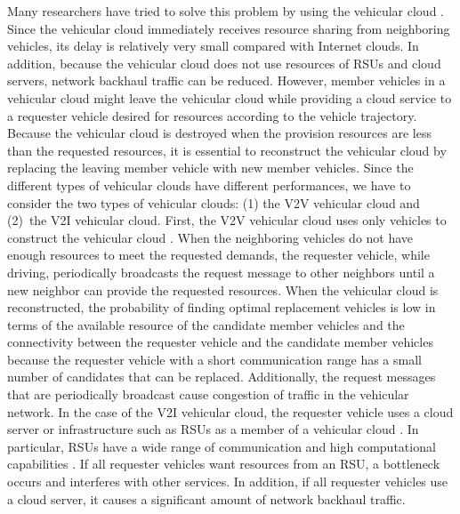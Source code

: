 \documentclass[electronics,aricle,accept,pdftex,moreauthors]{Definitions/mdpi}
\begin{document}
Many researchers have tried to solve this problem by using the vehicular cloud %
\cite{Meneguette2017j, Lin2017, Lee2019}.
Since the vehicular cloud immediately receives resource sharing from neighboring vehicles, its delay is relatively very small compared with Internet clouds.
In addition, because the vehicular cloud does not use resources of RSUs and cloud servers, network backhaul traffic can be reduced.
However, member vehicles in a vehicular cloud might leave the vehicular cloud while providing a cloud service to a requester vehicle desired for resources according to the vehicle trajectory.
Because the vehicular cloud is destroyed when the provision resources are less than the requested resources, it is essential to reconstruct the vehicular cloud by replacing the leaving member vehicle with new member vehicles.
Since the different types of vehicular clouds have different performances, we have to consider the two types of vehicular clouds: (1) the V2V vehicular cloud and (2)~the V2I vehicular cloud.
First, the V2V vehicular cloud uses only vehicles to construct the vehicular cloud \cite{Sibai2015, Meneguette2016, Meneguette2017b, Meneguette2017, Meneguette2017j, Choi2018}. %
When the neighboring vehicles do not have enough resources to meet the requested demands, the requester vehicle, while driving, periodically broadcasts the request message to other neighbors until a new neighbor can provide the requested resources.
When the vehicular cloud is reconstructed, the probability of finding optimal replacement vehicles is low in terms of the available resource of the candidate member vehicles and the connectivity between the requester vehicle and the candidate member vehicles because the requester vehicle with a short communication range has a small number of candidates that can be replaced.
Additionally, the request messages that are periodically broadcast cause congestion of traffic in the vehicular network.
In the case of the V2I vehicular cloud, the requester vehicle uses a cloud server or infrastructure such as RSUs as a member of a vehicular cloud \cite{Lee2019, Mershad2013, Mershad2013j, Yu2013, Salahuddin2014, Lin2017}. 
In particular, RSUs have a wide range of communication and high computational capabilities \cite{Gao2018}.
If all requester vehicles want resources from an RSU, a bottleneck occurs and interferes with other services.
In addition, if all requester vehicles use a cloud server, it causes a significant amount of network backhaul traffic.
\end{document}
